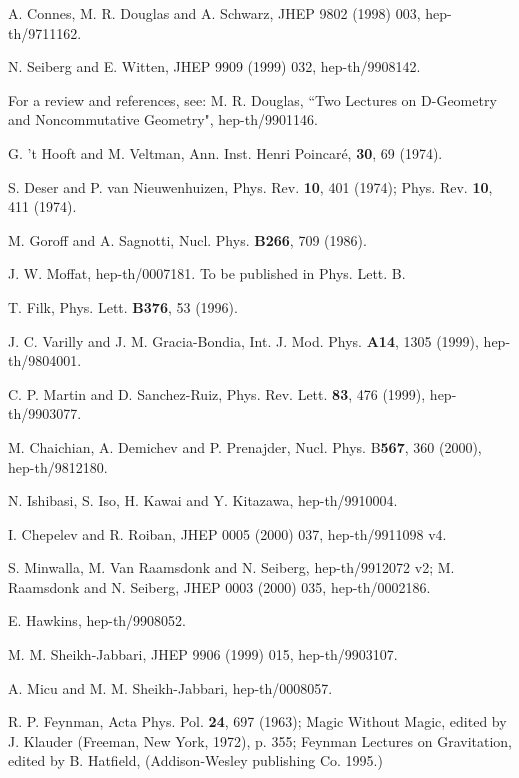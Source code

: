\documentclass[a4paper,10pt]{article}
\begin{document}
\begin{thebibliography}{100}

 A. Connes, M. R. Douglas and A. Schwarz, JHEP 9802 (1998)
003, hep-th/9711162.

 N. Seiberg and E. Witten, JHEP 9909 (1999) 032,
hep-th/9908142.

 For a review and references, see: M. R.
Douglas, ``Two Lectures on D-Geometry and Noncommutative Geometry",
hep-th/9901146.

 G. 't Hooft and M. Veltman, Ann. Inst. Henri
Poincar\'e, {\bf 30}, 69 (1974).

 S. Deser and P. van Nieuwenhuizen, Phys. Rev.
{\bf 10}, 401 (1974); Phys. Rev. {\bf 10}, 411 (1974).
 
 M. Goroff and A. Sagnotti, Nucl. Phys. {\bf
B266}, 709 (1986).

 J. W. Moffat, hep-th/0007181. To be published in Phys.
Lett. B.

 T. Filk, Phys. Lett. {\bf B376}, 53 (1996).

 J. C. Varilly and J. M. Gracia-Bondia, Int. J. Mod. Phys.
{\bf A14}, 1305 (1999), hep-th/9804001.

 C. P. Martin and D. Sanchez-Ruiz, Phys. Rev. Lett. {\bf
83}, 476 (1999), hep-th/9903077.

 M. Chaichian, A. Demichev and P. Prenajder, Nucl. Phys.
B{\bf 567}, 360 (2000), hep-th/9812180.

 N. Ishibasi, S. Iso, H. Kawai and Y. Kitazawa,
hep-th/9910004.

 I. Chepelev and R. Roiban, JHEP 0005 (2000) 037,
hep-th/9911098 v4.

 S. Minwalla, M. Van Raamsdonk and N. Seiberg,
hep-th/9912072 v2; M. Raamsdonk and N. Seiberg, JHEP 0003 (2000) 035,
hep-th/0002186.

 E. Hawkins, hep-th/9908052.

 M. M. Sheikh-Jabbari, JHEP 9906 (1999) 015,
hep-th/9903107.

 A. Micu and M. M. Sheikh-Jabbari, hep-th/0008057.

 R. P. Feynman, Acta Phys.
Pol. {\bf 24}, 697 (1963); Magic Without Magic, edited by J.
Klauder (Freeman, New York, 1972), p. 355; Feynman Lectures on
Gravitation, edited by B. Hatfield, (Addison-Wesley publishing
Co. 1995.)


\end{thebibliography}
\end{document}
